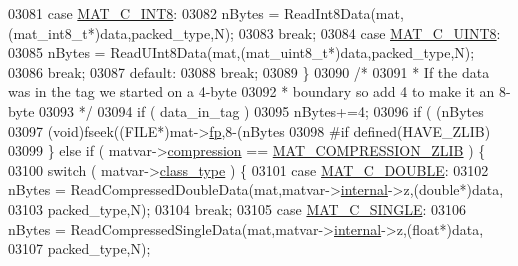 \begin{DoxyCode}
{{{{{{{{{{{{{{{{03081             \textcolor{keywordflow}{case} \hyperlink{group___m_a_t_ggad4d60ae7b709fc81bfd744fb4c857c40a984ff310f9e906100fcff95f704f43c5}{MAT\_C\_INT8}:
03082                 nBytes = ReadInt8Data(mat,(mat\_int8\_t*)data,packed\_type,N);
03083                 \textcolor{keywordflow}{break};
03084             \textcolor{keywordflow}{case} \hyperlink{group___m_a_t_ggad4d60ae7b709fc81bfd744fb4c857c40a81270f8093cb4808e992c1d29d84d4e3}{MAT\_C\_UINT8}:
03085                 nBytes = ReadUInt8Data(mat,(mat\_uint8\_t*)data,packed\_type,N);
03086                 \textcolor{keywordflow}{break};
03087             \textcolor{keywordflow}{default}:
03088                 \textcolor{keywordflow}{break};
03089         \}
03090         \textcolor{comment}{/*}
03091 \textcolor{comment}{         * If the data was in the tag we started on a 4-byte}
03092 \textcolor{comment}{         * boundary so add 4 to make it an 8-byte}
03093 \textcolor{comment}{         */}
03094         \textcolor{keywordflow}{if} ( data\_in\_tag )
03095             nBytes+=4;
03096         \textcolor{keywordflow}{if} ( (nBytes %
03097             (void)fseek((FILE*)mat->\hyperlink{struct__mat__t_a85f562e407ca9ad4d2a6e14f839432b7}{fp},8-(nBytes %
03098 \textcolor{preprocessor}{#if defined(HAVE\_ZLIB)}
03099     \} \textcolor{keywordflow}{else} \textcolor{keywordflow}{if} ( matvar->\hyperlink{group___m_a_t_aeef0466048621cb2c959ba7f6c774d06}{compression} == \hyperlink{group___m_a_t_gga768c318af97bd2567758ecb001ceb7f4a5181d2f71eab0f12f05ba65d4f13fb53}{MAT\_COMPRESSION\_ZLIB} ) \{
03100         \textcolor{keywordflow}{switch} ( matvar->\hyperlink{group___m_a_t_aff13035bf3265dd7d9425e5d40c839d4}{class\_type} ) \{
03101             \textcolor{keywordflow}{case} \hyperlink{group___m_a_t_ggad4d60ae7b709fc81bfd744fb4c857c40a5d70e0862e5bdb7bd86bf7ba5948f307}{MAT\_C\_DOUBLE}:
03102                 nBytes = ReadCompressedDoubleData(mat,matvar->\hyperlink{group___m_a_t_a6e97e3ed9f40c49322c18561c2a94e92}{internal}->z,(\textcolor{keywordtype}{double}*)data,
03103                                                   packed\_type,N);
03104                 \textcolor{keywordflow}{break};
03105             \textcolor{keywordflow}{case} \hyperlink{group___m_a_t_ggad4d60ae7b709fc81bfd744fb4c857c40a2825631e26a961cbe0f79db50a39cea2}{MAT\_C\_SINGLE}:
03106                 nBytes = ReadCompressedSingleData(mat,matvar->\hyperlink{group___m_a_t_a6e97e3ed9f40c49322c18561c2a94e92}{internal}->z,(\textcolor{keywordtype}{float}*)data,
03107                                                   packed\_type,N);
}}}}}}}}}}}}}}}}
\end{DoxyCode}
